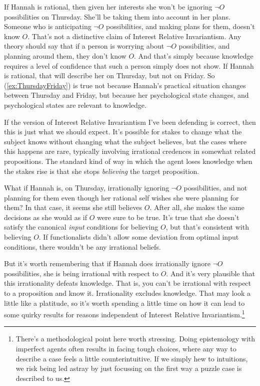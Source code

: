 If Hannah is rational, then given her interests she won't be ignoring \(\neg O\) possibilities on Thursday. She'll be taking them into account in her plans. Someone who is anticipating \(\neg O\) possibilities, and making plans for them, doesn't know \(O\). That's not a distinctive claim of Interest Relative Invariantism. Any theory should say that if a person is worrying about \(\neg O\) possibilities, and planning around them, they don't know \(O\). And that's simply because knowledge requires a level of confidence that such a person simply does not show. If Hannah is rational, that will describe her on Thursday, but not on Friday. So (\ref{ex:ThursdayFriday}) is true not because Hannah's practical situation changes between Thursday and Friday, but because her psychological state changes, and psychological states are relevant to knowledge.

If the version of Interest Relative Invariantism I've been defending is correct, then this is just what we should expect. It's possible for stakes to change what the subject knows without changing what the subject believes, but the cases where this happens are rare, typically involving irrational credences in somewhat related propositions. The standard kind of way in which the agent loses knowledge when the stakes rise is that she stops \textit{believing} the target proposition.

What if Hannah is, on Thursday, irrationally ignoring \(\neg O\) possibilities, and not planning for them even though her rational self wishes she were planning for them? In that case, it seems she still believes \(O\). After all, she makes the same decisions as she would as if \(O\) were sure to be true. It's true that she doesn't satisfy the canonical \textit{input} conditions for believing \(O\), but that's consistent with believing \(O\). If functionalists didn't allow some deviation from optimal input conditions, there wouldn't be any irrational beliefs.

But it's worth remembering that if Hannah does irrationally ignore \(\neg O\) possibilities, she is being irrational with respect to \(O\). And it's very plausible that this irrationality defeats knowledge. That is, you can't be irrational with respect to a proposition and know it. Irrationality excludes knowledge. That may look a little like a platitude, so it's worth spending a little time on how it can lead to some quirky results for reasons independent of Interest Relative Invariantism.\footnote{There's a methodological point here worth stressing. Doing epistemology with imperfect agents often results in facing tough choices, where any way to describe a case feels a little counterintuitive. If we simply hew to intuitions, we risk being led astray by just focussing on the first way a puzzle case is described to us.}

